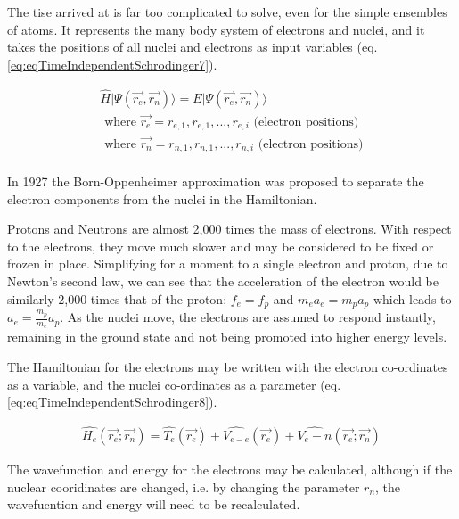 The \acrshort{tise} arrived at is far too complicated to solve, even for the simple ensembles of atoms.  It represents the many body system of electrons and nuclei, and it takes the positions of all nuclei and electrons as input variables (eq. \ref{eq:eqTimeIndependentSchrodinger7}).

\begin{equation}
\begin{split}
\hat{H} \lvert \Psi (\vec{r_e}, \vec{r_n}) \rangle = E \lvert \Psi (\vec{r_e}, \vec{r_n}) \rangle \\
\text{ where } \vec{r_e} = r_{e,1}, r_{e,1},...,r_{e,i} \text{ (electron positions)} \\
\text{ where } \vec{r_n} = r_{n,1}, r_{n,1},...,r_{n,i} \text{ (electron positions)} \\
\end{split}
\label{eq:eqTimeIndependentSchrodinger7}
\end{equation}

In 1927 the Born-Oppenheimer approximation was proposed to separate the electron components from the nuclei in the Hamiltonian.  

Protons and Neutrons are almost 2,000 times the mass of electrons.  With respect to the electrons, they move much slower and may be considered to be fixed or frozen in place.  Simplifying for a moment to a single electron and proton, due to Newton's second law, we can see that the acceleration of the electron would be similarly 2,000 times that of the proton: $f_e = f_p$ and $m_e a_e = m_p a_p$ which leads to $a_e = \frac{m_p}{m_e} a_p$.  As the nuclei move, the electrons are assumed to respond instantly, remaining in the ground state and not being promoted into higher energy levels.

The Hamiltonian for the electrons may be written with the electron co-ordinates as a variable, and the nuclei co-ordinates as a parameter (eq. \ref{eq:eqTimeIndependentSchrodinger8}).

\begin{equation}
\begin{split}
\hat{H_e} (\vec{r_e}; \vec{r_n}) = \hat{T_e}(\vec{r_e}) + \hat{V_{e-e}}(\vec{r_e}) + \hat{V_e-n}(\vec{r_e}; \vec{r_n})
\end{split}
\label{eq:eqTimeIndependentSchrodinger8}
\end{equation}

The wavefunction and energy for the electrons may be calculated, although if the nuclear cooridinates are changed, i.e. by changing the parameter $r_n$, the wavefucntion and energy will need to be recalculated.

